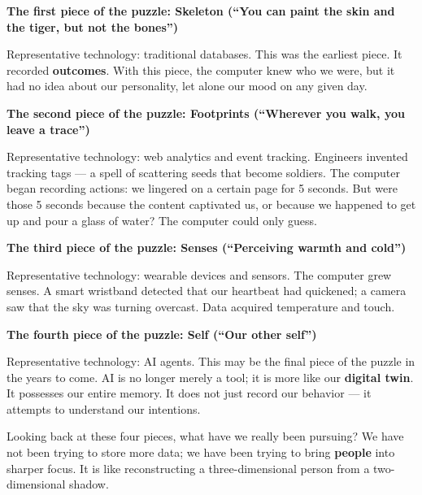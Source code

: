 \vspace{1em}

\textbf{The first piece of the puzzle: Skeleton (``You can paint the skin and the tiger, but not the bones'')}

Representative technology: traditional databases.
This was the earliest piece. It recorded \textbf{outcomes}.
With this piece, the computer knew who we were,
but it had no idea about our personality, let alone our mood on any given day.

\textbf{The second piece of the puzzle: Footprints (``Wherever you walk, you leave a trace'')}

Representative technology: web analytics and event tracking. Engineers invented tracking tags --- a spell of scattering seeds that become soldiers.
The computer began recording actions: we lingered on a certain page for 5 seconds.
But were those 5 seconds because the content captivated us, or because we happened to get up and pour a glass of water?
The computer could only guess.

\textbf{The third piece of the puzzle: Senses (``Perceiving warmth and cold'')}

Representative technology: wearable devices and sensors.
The computer grew senses.
A smart wristband detected that our heartbeat had quickened; a camera saw that the sky was turning overcast.
Data acquired temperature and touch.

\textbf{The fourth piece of the puzzle: Self (``Our other self'')}

Representative technology: AI agents.
This may be the final piece of the puzzle in the years to come.
AI is no longer merely a tool; it is more like our \textbf{digital twin}.
It possesses our entire memory.
It does not just record our behavior --- it attempts to understand our intentions.

\vspace{1em}

Looking back at these four pieces, what have we really been pursuing?
We have not been trying to store more data; we have been trying to bring \textbf{people} into sharper focus. It is like reconstructing a three-dimensional person from a two-dimensional shadow.





